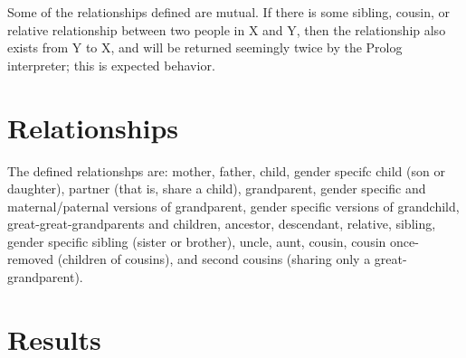 \documentclass[12pt, article]{scrartcl}
\begin{document}
Some of the relationships defined are mutual. If there is some sibling, cousin, or relative relationship between two people in X and Y, then the relationship also exists from Y to X, and will be returned seemingly twice by the Prolog interpreter; this is expected behavior.

\section{Relationships}
The defined relationshps are: mother, father, child, gender specifc child (son or daughter), partner (that is, share a child), grandparent, gender specific and maternal/paternal versions of grandparent, gender specific versions of grandchild, great-great-grandparents and children, ancestor, descendant, relative, sibling, gender specific sibling (sister or brother), uncle, aunt, cousin, cousin once-removed (children of cousins), and second cousins (sharing only a great-grandparent).

\section{Results}
\end{document}
